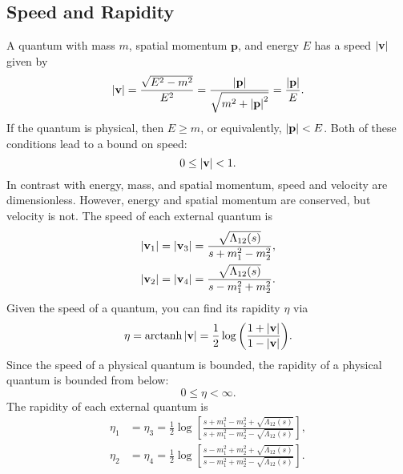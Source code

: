 \subsection{Speed and Rapidity}
A quantum with mass $m$, spatial momentum $\mathbf{p}$, and energy $E$ has a speed $\left\lvert \mathbf{v} \right\rvert$ given by
\begin{equation}
	\left\lvert \mathbf{v} \right\rvert = \frac{\sqrt{E^{2} - m^{2}}}{E^{2}} = \frac{\left\lvert \mathbf{p} \right\rvert}{\sqrt{m^{2} + \left\lvert \mathbf{p} \right\rvert^{2}}} = \frac{\left\lvert \mathbf{p} \right\rvert}{E}.
\end{equation}
If the quantum is physical, then $E \geq m$, or equivalently, $\left\lvert \mathbf{p} \right\rvert < E$. Both of these conditions lead to a bound on speed:
\begin{equation}
	0 \leq \left\lvert \mathbf{v} \right\rvert < 1.
\end{equation}
In contrast with energy, mass, and spatial momentum, speed and velocity are dimensionless. However, energy and spatial momentum are conserved, but velocity is not. The speed of each external quantum is
\begin{align}
	\left\lvert \mathbf{v}_{1} \right\rvert &= \left\lvert \mathbf{v}_{3} \right\rvert = \frac{\sqrt{\Lambda_{12}(s)}}{s + m_{1}^{2} - m_{2}^{2}}, \\
	\left\lvert \mathbf{v}_{2} \right\rvert &= \left\lvert \mathbf{v}_{4} \right\rvert = \frac{\sqrt{\Lambda_{12}(s)}}{s - m_{1}^{2} + m_{2}^{2}}.
\end{align}
Given the speed of a quantum, you can find its rapidity $\eta$ via
\begin{equation}
	\eta = \operatorname{arctanh}{\left\lvert \mathbf{v} \right\rvert} = \frac{1}{2} \log{\left( \frac{1 + \left\lvert \mathbf{v} \right\rvert}{1 - \left\lvert \mathbf{v} \right\rvert} \right)}.
\end{equation}
Since the speed of a physical quantum is bounded, the rapidity of a physical quantum is bounded from below:
\begin{equation}
	0 \leq \eta < \infty.
\end{equation}
The rapidity of each external quantum is
\begin{align}
	\eta_{1} &= \eta_{3} = \frac{1}{2} \log{\left[\frac{s + m_{1}^{2} - m_{2}^{2} + \sqrt{\Lambda_{12}(s)}}{s + m_{1}^{2} - m_{2}^{2} - \sqrt{\Lambda_{12}(s)}}\right]}, \\
	\eta_{2} &= \eta_{4} = \frac{1}{2} \log{\left[\frac{s - m_{1}^{2} + m_{2}^{2} + \sqrt{\Lambda_{12}(s)}}{s - m_{1}^{2} + m_{2}^{2} - \sqrt{\Lambda_{12}(s)}}\right]}.
\end{align}
